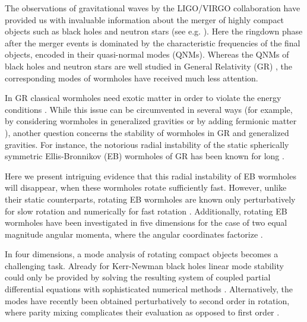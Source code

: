\documentclass[twocolumn,showpacs,preprintnumbers,amsmath,amssymb,floatfix]{revtex4-1}
\begin{document}
The observations of gravitational waves by the LIGO/VIRGO collaboration have provided us with invaluable information about the merger of highly compact objects such as black holes and neutron stars (see e.g. \cite{LIGOScientific:2016aoc,LIGOScientific:2017vwq}). 
Here the ringdown phase after the merger events is dominated by the characteristic frequencies of the final objects, encoded in their quasi-normal modes (QNMs).
Whereas the QNMs of black holes and neutron stars are well studied in General Relativity (GR) \cite{Kokkotas:1999bd,Berti:2009kk,Konoplya:2011qq}, the corresponding modes of wormholes have received much less attention. %

In GR classical wormholes need exotic matter in order to violate the energy conditions \cite{Ellis:1973yv,Ellis:1979bh,Bronnikov:1973fh,Morris:1988tu,Morris:1988cz,Visser:1995cc,Hochberg:1996ee,Hochberg:1998ii,Visser:2003yf,Bronnikov:2005gm,Alcubierre:2017pqm}.
%
While this issue can be circumvented in several ways (for example, by considering wormholes in generalized gravities \cite{Kanti:2011jz,Alcubierre:2017pqm} or by adding fermionic matter \cite{Blazquez-Salcedo:2020czn,Konoplya:2021hsm}),
%
another question concerns the stability of wormholes in GR and generalized gravities. 
For instance, the notorious radial instability of the static spherically symmetric Ellis-Bronnikov (EB) wormholes of GR has been known for long \cite{Shinkai:2002gv,Gonzalez:2008wd,Gonzalez:2008xk,Cremona:2018wkj,Blazquez-Salcedo:2018ipc}.


Here we present intriguing evidence that this radial instability of EB wormholes will disappear, when these wormholes rotate sufficiently fast.
However, unlike their static counterparts, rotating EB wormholes are known only perturbatively for slow rotation \cite{Kashargin:2007mm,Kashargin:2008pk} and numerically for fast rotation \cite{Kleihaus:2014dla,Chew:2016epf}.
Additionally, rotating EB wormholes have been investigated in five dimensions for the case of two equal magnitude angular momenta, where the angular coordinates factorize \cite{Dzhunushaliev:2013jja}.

In four dimensions, a mode analysis of rotating compact objects becomes a challenging task.
Already for Kerr-Newman black holes linear mode stability could only be provided by solving the resulting system of coupled partial differential equations with sophisticated numerical methods \cite{Dias:2015wqa}.
Alternatively, the modes have recently been obtained perturbatively to second order in rotation, where parity mixing complicates their evaluation as opposed to first order \cite{Blazquez-Salcedo:2022eik}.
\end{document}
